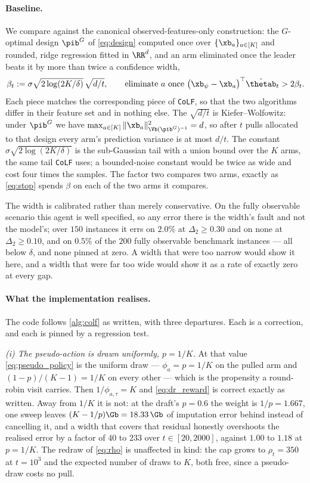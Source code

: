 \paragraph{Baseline.}
We compare against the canonical observed-features-only construction: the
$G$-optimal design $\pib^G$ of \cref{eq:design} computed once over
$\{\xb_a\}_{a\in[K]}$ and rounded, ridge regression fitted in $\RR^d$, and an
arm eliminated once the leader beats it by more than twice a confidence width,
\[
  \beta_t := \sigma\sqrt{2\log(2K/\delta)}\,\sqrt{d/t},
  \qquad
  \text{eliminate } a \text{ once }
  \big(\xb_{\psi}-\xb_a\big)^\top\hat\thetab_t > 2\beta_t .
\]
Each piece matches the corresponding piece of \texttt{CoLF}, so that the two
algorithms differ in their feature set and in nothing else.  The $\sqrt{d/t}$
is Kiefer--Wolfowitz: under $\pib^G$ we have
$\max_{a\in[K]}\|\xb_a\|^2_{\Vb(\pib^G)^{-1}}=d$, so after $t$ pulls allocated
to that design every arm's prediction variance is at most $d/t$.  The constant
$\sigma\sqrt{2\log(2K/\delta)}$ is the sub-Gaussian tail with a union bound
over the $K$ arms, the same tail \texttt{CoLF} uses; a bounded-noise constant
would be twice as wide and cost four times the samples.  The factor two
compares two arms, exactly as \cref{eq:stop} spends $\beta$ on each of the two
arms it compares.

The width is calibrated rather than merely conservative.  On the fully
observable scenario this agent is well specified, so any error there is the
width's fault and not the model's; over $150$ instances it errs on $2.0\%$ at
$\Delta_2\ge0.30$ and on none at $\Delta_2\ge0.10$, and on $0.5\%$ of the $200$
fully observable benchmark instances --- all below $\delta$, and none pinned at
zero.  A width that were too narrow would show it here, and a
width that were far too wide would show it as a rate of exactly zero at every
gap.

\paragraph{What the implementation realises.}
The code follows \cref{alg:colf} as written, with three departures.  Each is a
correction, and each is pinned by a regression test.

\emph{(i) The pseudo-action is drawn uniformly, $p=1/K$.}  At that value
\cref{eq:pseudo_policy} is the uniform draw --- $\phi_a=p=1/K$ on the pulled arm
and $(1-p)/(K-1)=1/K$ on every other --- which is the propensity a round-robin
visit carries.  Then $1/\phi_{a,\tau}=K$ and \cref{eq:dr_reward} is correct
exactly as written.  Away from $1/K$ it is not: at the draft's $p=0.6$ the
weight is $1/p=1.667$, one sweep leaves $(K-1/p)\Gb=18.33\,\Gb$ of imputation
error behind instead of cancelling it, and a width that covers that residual
honestly overshoots the realised error by a factor of $40$ to $233$ over
$t\in[20,2000]$, against $1.00$ to $1.18$ at $p=1/K$.  The redraw of
\cref{eq:rho} is unaffected in kind: the cap grows to $\rho_t=350$ at $t=10^3$
and the expected number of draws to $K$, both free, since a pseudo-draw costs
no pull.

